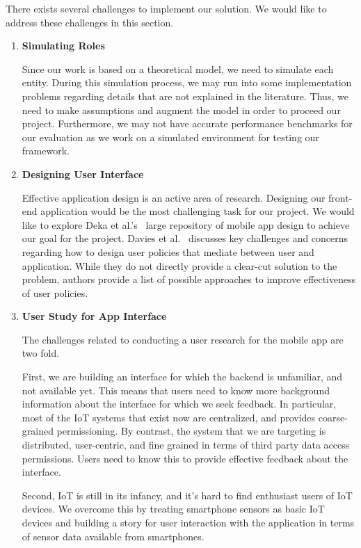 There exists several challenges to implement our solution. We would like to address these challenges in this section. 

\begin{enumerate}
\item \textbf{Simulating Roles}

Since our work is based on a theoretical model, we need to simulate each entity. During this simulation process, we may run into some implementation problems regarding details that are not explained in the literature. Thus, we need to make assumptions and augment the model in order to proceed our project. Furthermore, we may not have accurate performance benchmarks for our evaluation as we work on a simulated environment for testing our framework. 

\item \textbf{Designing User Interface}

Effective application design is an active area of research. Designing our front-end application would be the most challenging task for our project. We would like to explore Deka et al.'s~\cite{rico} large repository of mobile app design to achieve our goal for the project. Davies et al.~\cite{davies} discusses key challenges and concerns regarding how to design user policies that mediate between user and application. While they do not directly provide a clear-cut solution to the problem, authors provide a list of possible approaches to improve effectiveness of user policies.  

\item \textbf{User Study for App Interface}

The challenges related to conducting a user research for the mobile app are two fold.

First, we are building an interface for which the backend is unfamiliar, and not available yet. This means that users need to know more background information about the interface for which we seek feedback. In particular, most of the IoT systems that exist now are centralized, and provides coarse-grained permissioning. By contrast, the system that we are targeting is distributed, user-centric, and fine grained in terms of third party data access permissions. Users need to know this to provide effective feedback about the interface.

Second, IoT is still in its infancy, and it's hard to find enthusiast users of IoT devices. We overcome this by treating smartphone sensors as basic IoT devices and building a story for user interaction with the application in terms of sensor data available from smartphones.
\end{enumerate}